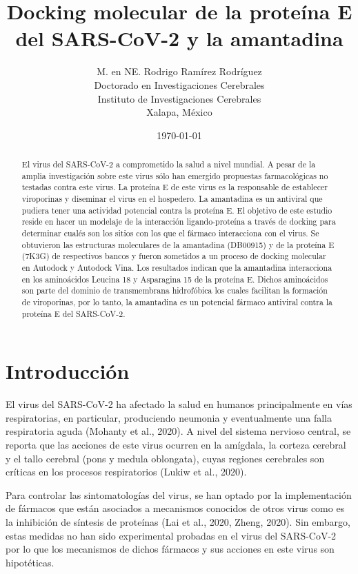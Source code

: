\documentclass[titlepage, 12pt]{article}
\title{\textbf{Docking molecular de la proteína E del SARS-CoV-2 y la amantadina}}
\author{
    M. en NE. Rodrigo Ramírez Rodríguez \\
                Doctorado en Investigaciones Cerebrales\\
        Instituto de Investigaciones Cerebrales\\
        Xalapa, México
            }
\date{\today}
\begin{document}
\maketitle

\begin{abstract}
El virus del SARS-CoV-2 a comprometido la salud a nivel mundial. A pesar de la amplia investigación sobre este virus sólo han emergido propuestas farmacológicas no testadas contra este virus. La proteína E de este virus es la responsable de establecer viroporinas y diseminar el virus en el hospedero. La amantadina es un antiviral que pudiera tener una actividad potencial contra la proteína E. El objetivo de este estudio reside en hacer un modelaje de la interacción ligando-proteína a través de docking para determinar cualés son los sitios con los que el fármaco interacciona con el virus. Se obtuvieron las estructuras moleculares de la amantadina (DB00915) y de la proteína E (7K3G) de respectivos bancos y fueron sometidos a un proceso de docking molecular en Autodock y Autodock Vina. Los resultados indican que la amantadina interacciona en los aminoácidos Leucina 18 y Asparagina 15 de la proteína E. Dichos aminoácidos son parte del dominio de transmembrana hidrofóbica los cuales facilitan la formación de viroporinas, por lo tanto, la amantadina es un potencial fármaco antiviral contra la proteína E del SARS-CoV-2.
\end{abstract}


\section{Introducción}

El virus del SARS-CoV-2 ha afectado la salud en humanos principalmente en vías respiratorias, en particular, produciendo neumonia y eventualmente una falla respiratoria aguda (Mohanty et al., 2020). A nivel del sistema nervioso central, se reporta que las acciones de este virus ocurren en la amígdala, la corteza cerebral y el tallo cerebral (pons y medula oblongata), cuyas regiones cerebrales son críticas en los procesos respiratorios (Lukiw et al., 2020).

Para controlar las sintomatologías del virus, se han optado por la implementación de fármacos que están asociados a mecanismos conocidos de otros virus como es la inhibición de síntesis de proteínas (Lai et al., 2020, Zheng, 2020). Sin embargo, estas medidas no han sido experimental probadas en el virus del SARS-CoV-2 por lo que los mecanismos de dichos fármacos y sus acciones en este virus son hipotéticas.
\end{document}
